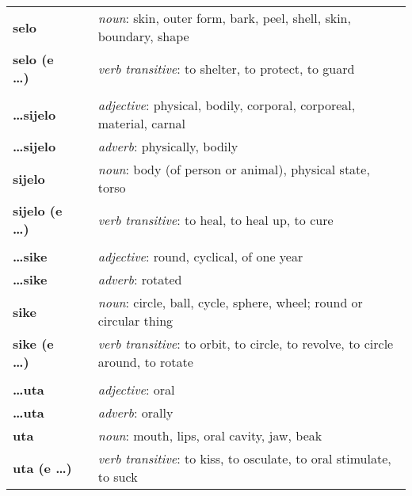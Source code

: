 \begin{supertabular}{p{2,5cm}|ll}
    \textbf{selo}             &  & \textit{noun}: skin, outer form, bark, peel, shell, skin, boundary, shape                   \\
    \textbf{selo (e \dots)}   &  & \textit{verb transitive}: to shelter, to protect, to guard                                  \\
                              &  &                                                                                             \\
    \textbf{\dots sijelo}     &  & \textit{adjective}: physical, bodily, corporal, corporeal, material, carnal                 \\
    \textbf{\dots sijelo}     &  & \textit{adverb}: physically, bodily                                                         \\
    \textbf{sijelo}           &  & \textit{noun}: body (of person or animal), physical state, torso                            \\
    \textbf{sijelo (e \dots)} &  & \textit{verb transitive}: to heal, to heal up, to cure                                      \\
                              &  &                                                                                             \\
    \textbf{\dots sike}       &  & \textit{adjective}: round, cyclical, of one year                                            \\
    \textbf{\dots sike}       &  & \textit{adverb}: rotated                                                                    \\
    \textbf{sike}             &  & \textit{noun}: circle, ball, cycle, sphere, wheel; round or circular thing                  \\
    \textbf{sike (e \dots)}   &  & \textit{verb transitive}: to orbit, to circle, to revolve, to circle around, to rotate      \\
                              &  &                                                                                             \\
    \textbf{\dots uta}        &  & \textit{adjective}: oral                                                                    \\
    \textbf{\dots uta}        &  & \textit{adverb}: orally                                                                     \\
    \textbf{uta}              &  & \textit{noun}: mouth, lips, oral cavity, jaw, beak                                          \\
    \textbf{uta (e \dots)}    &  & \textit{verb transitive}: to kiss, to osculate, to oral stimulate, to suck                  \\
\end{supertabular}

